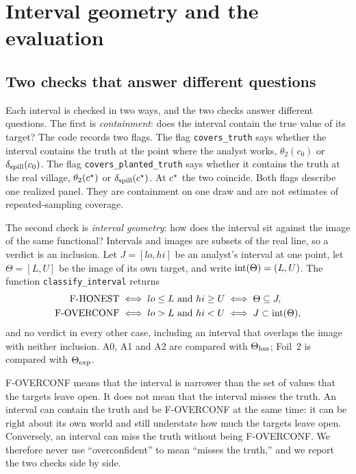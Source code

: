 \section{Interval geometry and the evaluation}\label{sec:evaluation}

\subsection{Two checks that answer different questions}\label{sec:geometry}

Each interval is checked in two ways, and the two checks answer different
questions. The first is \emph{containment}: does the interval contain the true
value of its target? The code records two flags. The flag \texttt{covers\_truth}
says whether the interval contains the truth at the point where the analyst works,
$\theta_2(c_0)$ or $\delta_{\mathrm{spill}}(c_0)$. The flag \texttt{covers\_planted\_truth} says
whether it contains the truth at the real village, $\theta_2(c^\star)$ or
$\delta_{\mathrm{spill}}(c^\star)$. At $c^\star$ the two coincide. Both flags describe one realized
panel. They are containment on one draw and are not estimates of
repeated-sampling coverage.

The second check is \emph{interval geometry}: how does the interval sit against
the image of the same functional? Intervals and images are subsets of the real
line, so a verdict is an inclusion. Let $J=[lo,hi]$ be an analyst's interval at
one point, let $\Theta=[L,U]$ be the image of its own target, and write
$\operatorname{int}(\Theta)=(L,U)$. The function \texttt{classify\_interval} returns
\begin{align}
  \text{F-HONEST}
  &\iff lo\le L\ \text{and}\ hi\ge U
  \iff \Theta\subseteq J, \label{eq:honest}\\
  \text{F-OVERCONF}
  &\iff lo>L\ \text{and}\ hi<U
  \iff J\subset\operatorname{int}(\Theta), \label{eq:overconf}
\end{align}
and no verdict in every other case, including an interval that overlaps the image
with neither inclusion. A0, A1 and A2 are compared with $\Theta_{\mathrm{hm}}$; Foil~2 is
compared with $\Theta_{\mathrm{exp}}$.

F-OVERCONF means that the interval is narrower than the set of values that the
targets leave open. It does not mean that the interval misses the truth. An
interval can contain the truth and be F-OVERCONF at the same time: it can be right
about its own world and still understate how much the targets leave open.
Conversely, an interval can miss the truth without being F-OVERCONF. We therefore
never use ``overconfident'' to mean ``misses the truth,'' and we report the two
checks side by side.

